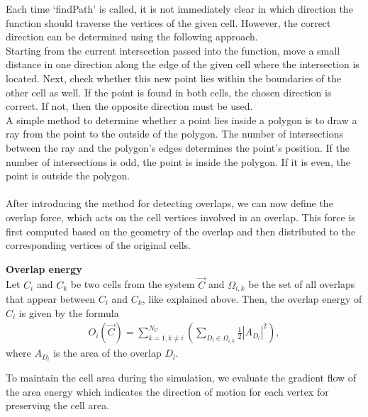 Each time `findPath' is called, it is not immediately clear in which direction the function should traverse the vertices of the given cell. 
However, the correct direction can be determined using the following approach. \\
Starting from the current intersection passed into the function, move a small distance in one direction along the edge of the given cell where the intersection is located. Next, check whether this new point lies within the boundaries of the other cell as well. 
If the point is found in both cells, the chosen direction is correct. 
If not, then the opposite direction must be used. \\ 
A simple method to determine whether a point lies inside a polygon is to draw a ray from the point to the outside of the polygon. 
The number of intersections between the ray and the polygon's edges determines the point's position. 
If the number of intersections is odd, the point is inside the polygon.
If it is even, the point is outside the polygon. \\ 
\smallskip  \\
After introducing the method for detecting overlaps, we can now define the overlap force, which acts on the cell vertices involved in an overlap. 
This force is first computed based on the geometry of the overlap and then distributed to the corresponding vertices of the original cells. 

\begin{definition} \textbf{Overlap energy} \\
	Let $C_i$ and $C_k$ be two cells from the system $\vec{C}$ and $\Omega_{i,k}$ be the set of all overlaps that appear between $C_i$ and $C_k$, like explained above. Then, the overlap energy of $C_i$ is given by the formula 
	\begin{align}
		O_i(\vec{C}) = \sum\limits_{k=1, k \neq i}^{N_C} (\sum\limits_{D_l \in \Omega_{i,k}} \frac{1}{2}|A_{D_l}|^2),		
	\end{align} 
	where $A_{D_l}$ is the area of the overlap $D_l$.  \\
\end{definition}

To maintain the cell area during the simulation, we evaluate the gradient flow of the area energy which indicates the direction of motion for each vertex for preserving the cell area.

